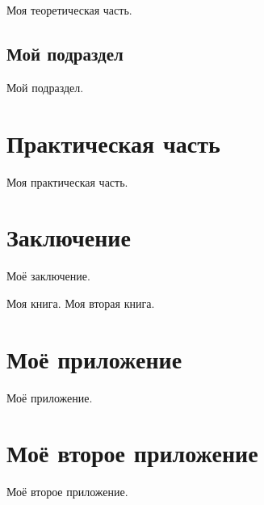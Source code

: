\documentclass{../mirea-prog-lang}
\begin{document}
Моя теоретическая часть.

\subsection{Мой подраздел}

Мой подраздел.



\section{Практическая часть}

Моя практическая часть.



\section*{Заключение}
{}

Моё заключение.



\begin{thebibliography}{99\kern\bibindent}
	 Моя книга.
	 Моя вторая книга. 
\end{thebibliography}



\appendix

\section{Моё приложение}

Моё приложение.

\section{Моё второе приложение}

Моё второе приложение.


	
\end{document}
